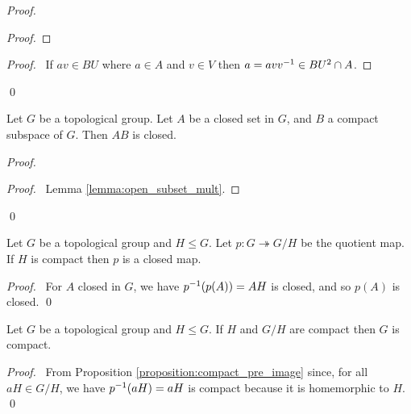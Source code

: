 \begin{proof}
    \pf
    \begin{proof}
    \end{proof}
    \begin{proof}
        \pf\ If $av \in BU$ where $a \in A$ and $v \in V$ then $a = a v {v}^{-1} \in BU^2 \cap A$.
    \end{proof}
    \qed
\end{proof}

\begin{proposition}[AC]
    Let $G$ be a topological group. Let $A$ be a closed set in $G$, and $B$ a compact subspace of $G$. Then $AB$ is closed.
\end{proposition}

\begin{proof}
    \pf
    \begin{proof}
        \pf\ Lemma \ref{lemma:open_subset_mult}.
    \end{proof}
    \qed
\end{proof}

\begin{corollary}
    Let $G$ be a topological group and $H \leq G$. Let $p : G \twoheadrightarrow G / H$ be the quotient map.
    If $H$ is compact then $p$ is a closed map.
\end{corollary}

\begin{proof}
    \pf\ For $A$ closed in $G$, we have ${p}^{-1}(p(A)) = AH$ is closed, and so
    $p(A)$ is closed. \qed
\end{proof}

\begin{corollary}
    Let $G$ be a topological group and $H \leq G$. If $H$ and $G / H$ are compact then $G$ is compact.
\end{corollary}

\begin{proof}
    \pf\ From Proposition \ref{proposition:compact_pre_image} since, for all $aH \in G / H$,
    we have ${p}^{-1}(aH) = aH$ is compact because it is homemorphic to $H$. \qed
\end{proof}